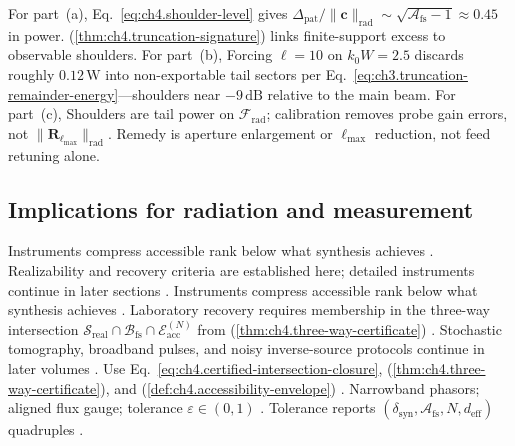 For part~(a), Eq.~\eqref{eq:ch4.shoulder-level} gives $\Delta_{\mathrm{pat}}/\|\mathbf{c}\|_{\mathrm{rad}}\sim\sqrt{\mathcal{A}_{\mathrm{fs}}-1}\approx0.45$ in power. (\ref{thm:ch4.truncation-signature}) links finite-support excess to observable shoulders.
For part~(b), Forcing $\ell=10$ on $k_{0}W=2.5$ discards roughly $0.12\,\mathrm{W}$ into non-exportable tail sectors per Eq.~\eqref{eq:ch3.truncation-remainder-energy}---shoulders near $-9\,\mathrm{dB}$ relative to the main beam.
For part~(c), Shoulders are tail power on $\mathcal{F}_{\mathrm{rad}}$; calibration removes probe gain errors, not $\|\mathbf{R}_{\ell_{\max}}\|_{\mathrm{rad}}$. Remedy is aperture enlargement or $\ell_{\max}$ reduction, not feed retuning alone.
\subsection{Implications for radiation and measurement}
\label{sec:ch494}
Instruments compress accessible rank below what synthesis achieves \cite{stratton1941}.
Realizability and recovery criteria are established here; detailed instruments continue in later sections \cite{harrington2001}.
\medskip
Instruments compress accessible rank below what synthesis achieves \cite{stratton1941}.
Laboratory recovery requires membership in the three-way intersection \(\mathcal{S}_{\mathrm{real}}\cap\mathcal{B}_{\mathrm{fs}}\cap\mathcal{E}_{\mathrm{acc}}^{(N)}\)
from (\ref{thm:ch4.three-way-certificate}) \cite{harrington2001}. 
Stochastic tomography, broadband pulses, and noisy inverse-source protocols continue in later volumes
\cite{harrington2001}.
Use Eq.~\eqref{eq:ch4.certified-intersection-closure}, (\ref{thm:ch4.three-way-certificate}), and
(\ref{def:ch4.accessibility-envelope}) \cite{harrington2001}. Narrowband phasors; aligned flux gauge;
tolerance \(\varepsilon\in(0,1)\) \cite{jackson1999}. Tolerance reports \((\delta_{\mathrm{syn}},\mathcal{A}_{\mathrm{fs}},N,d_{\mathrm{eff}})\) quadruples
\cite{collin2001}.
